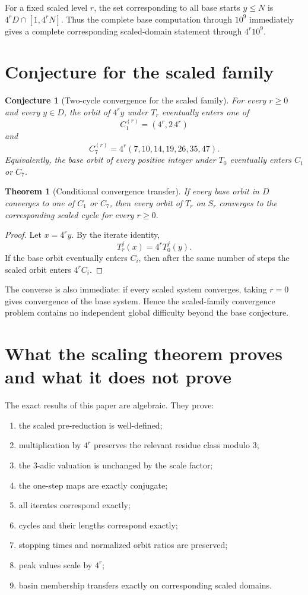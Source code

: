 \documentclass[11pt]{article}
\newtheorem{theorem}[definition]{Theorem}
\newtheorem{conjecture}[definition]{Conjecture}
\begin{document}
For a fixed scaled level $r$, the set corresponding to all base starts $y\le N$ is $4^rD\cap[1,4^rN]$. Thus the complete base computation through $10^9$ immediately gives a complete corresponding scaled-domain statement through $4^r10^9$.

\section{Conjecture for the scaled family}
\begin{conjecture}[Two-cycle convergence for the scaled family]
For every $r\ge0$ and every $y\in D$, the orbit of $4^ry$ under $T_r$ eventually enters one of
\[
C_1^{(r)}=(4^r,2\,4^r)
\]
and
\[
C_7^{(r)}=4^r(7,10,14,19,26,35,47).
\]
Equivalently, the base orbit of every positive integer under $T_0$ eventually enters $C_1$ or $C_7$.
\end{conjecture}

\begin{theorem}[Conditional convergence transfer]
If every base orbit in $D$ converges to one of $C_1$ or $C_7$, then every orbit of $T_r$ on $S_r$ converges to the corresponding scaled cycle for every $r\ge0$.
\end{theorem}
\begin{proof}
Let $x=4^ry$. By the iterate identity,
\[
T_r^j(x)=4^rT_0^j(y).
\]
If the base orbit eventually enters $C_i$, then after the same number of steps the scaled orbit enters $4^rC_i$.\end{proof}

The converse is also immediate: if every scaled system converges, taking $r=0$ gives convergence of the base system. Hence the scaled-family convergence problem contains no independent global difficulty beyond the base conjecture.

\section{What the scaling theorem proves and what it does not prove}
The exact results of this paper are algebraic. They prove:
\begin{enumerate}[label=(\roman*)]
\item the scaled pre-reduction is well-defined;
\item multiplication by $4^r$ preserves the relevant residue class modulo $3$;
\item the $3$-adic valuation is unchanged by the scale factor;
\item the one-step maps are exactly conjugate;
\item all iterates correspond exactly;
\item cycles and their lengths correspond exactly;
\item stopping times and normalized orbit ratios are preserved;
\item peak values scale by $4^r$;
\item basin membership transfers exactly on corresponding scaled domains.
\end{enumerate}
\end{document}
